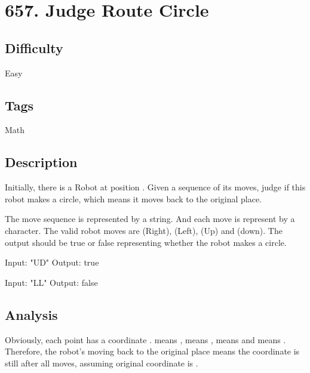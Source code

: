\tocless\section{657. Judge Route Circle}
\label{algo:657}

\subsection*{Difficulty}
Easy

\subsection*{Tags}
Math

\subsection*{Description}
Initially, there is a Robot at position . Given a sequence of its moves, judge if this robot makes a circle, which means it moves back to the original place.

The move sequence is represented by a string. And each move is represent by a character. The valid robot moves are  (Right),  (Left),  (Up) and  (down). The output should be true or false representing whether the robot makes a circle.

\begin{example}
\begin{multilinecode}
Input: "UD"
Output: true
\end{multilinecode}
\end{example}

\begin{example}
\begin{multilinecode}
Input: "LL"
Output: false
\end{multilinecode}
\end{example}

\subsection*{Analysis}
Obviously, each point has a coordinate .  means ,  means ,  means  and  means . Therefore, the robot's moving back to the original place means the coordinate is still  after all moves, assuming original coordinate is .


